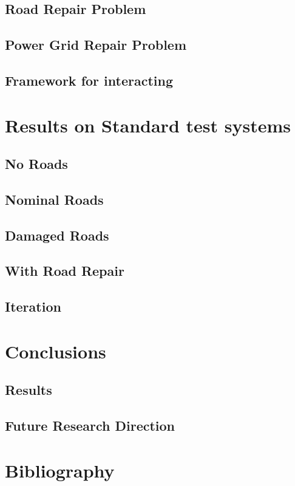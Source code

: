 \documentclass{article}
\begin{document}
	\subsection{Road Repair Problem}
	\subsection{Power Grid Repair Problem}
	\subsection{Framework for interacting}
	\section{Results on Standard test systems}
	\subsection{No Roads}
	\subsection{Nominal Roads}
	\subsection{Damaged Roads}
	\subsection{With Road Repair}
	\subsection{Iteration}
	\section{Conclusions}
	\subsection{Results}
	\subsection{Future Research Direction}
	\section{Bibliography}
\end{document}
